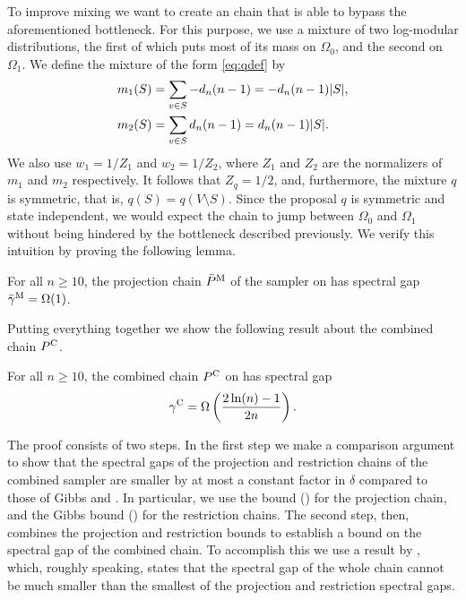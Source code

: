 To improve mixing we want to create an \Ms{} chain that is able to bypass the aforementioned bottleneck.
For this purpose, we use a mixture of two log-modular distributions, the first of which puts most of its mass on $\Omega_0$, and the second on $\Omega_1$.
We define the mixture of the form \eqref{eq:qdef} by
\begin{align*}
  m_1(S) &= \sum_{v \in S} -d_n (n-1) = -d_n (n-1) |S|,\\
  m_2(S) &= \sum_{v \in S} d_n (n-1) = d_n (n-1) |S|.
\end{align*}
We also use $w_1 = 1 / Z_1$ and $w_2 = 1 / Z_2$, where $Z_1$ and $Z_2$ are the normalizers of $m_1$ and $m_2$ respectively.
It follows that $Z_q = 1 / 2$, and, furthermore, the mixture $q$ is symmetric, that is, $q(S) = q(V \setminus S)$.
Since the proposal $q$ is symmetric and state independent, we would expect the \Ms{} chain to jump between $\Omega_0$ and $\Omega_1$ without being hindered by the bottleneck described previously.
We verify this intuition by proving the following lemma.
\begin{lemma} \label{lem:mproj}
  For all $n \geq 10$, the projection chain $\bar{P}^{\mathrm{M}}$ of the \Ms{} sampler on \ising{} has spectral gap $\bar{\gamma}^{\mathrm{M}} = \Omega(1)$.
\end{lemma}

Putting everything together we show the following result about the combined chain $P^{\mathrm{C}}$.
\begin{theorem}
  For all $n \geq 10$, the combined chain $P^{\mathrm{C}}$ on \ising{} has spectral gap
  \begin{align*}
    \gamma^{\mathrm{C}} = \Omega\left( \displaystyle\frac{2\ln(n) - 1}{2n} \right).
  \end{align*}
\end{theorem}
The proof consists of two steps.
In the first step we make a comparison argument \citep{diaconis93,levin08book} to show that the spectral gaps of the projection and restriction chains of the combined sampler are smaller by at most a constant factor in $\delta$ compared to those of Gibbs and \Ms{}.
In particular, we use the \Ms{} bound () for the projection chain, and the Gibbs bound () for the restriction chains.
The second step, then, combines the projection and restriction bounds to establish a bound on the spectral gap of the combined chain.
To accomplish this we use a result by \cite{jerrum04poincare}, which, roughly speaking, states that the spectral gap of the whole chain cannot be much smaller than the smallest of the projection and restriction spectral gaps.

